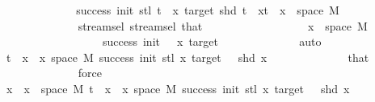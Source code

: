 \begin{isabellebody}
\isanewline
\ \ \ \ \ \ \ \ \ \ \isamarkupfalse%
\ \isamarkupfalse%
\ {\isachardoublequoteopen}success\ {\isacharparenleft}{\kern0pt}init{\isacharminus}{\kern0pt}{}{\isacharparenright}{\kern0pt}\ {\isacharparenleft}{\kern0pt}stl\ {\isacharparenleft}{\kern0pt}t\ {\isacharhash}{\kern0pt}{\isacharhash}{\kern0pt}\ x{\isacharparenright}{\kern0pt}{\isacharparenright}{\kern0pt}\ target{\isachardoublequoteclose}{\isachardoublequoteopen}{\isasymnot}\ shd\ {\isacharparenleft}{\kern0pt}t\ {\isacharhash}{\kern0pt}{\isacharhash}{\kern0pt}\ x{\isacharparenright}{\kern0pt}{\isachardoublequoteclose}{\isachardoublequoteopen}{\isacharparenleft}{\kern0pt}t\ {\isacharhash}{\kern0pt}{\isacharhash}{\kern0pt}\ x{\isacharparenright}{\kern0pt}\ {\isasymin}\ space\ M{\isachardoublequoteclose}\isanewline
\ \ \ \ \ \ \ \ \ \ \ \ \isamarkupfalse%
\ stream{\isachardot}{\kern0pt}sel{\isacharparenleft}{\kern0pt}{}{\isacharparenright}{\kern0pt}\ stream{\isachardot}{\kern0pt}sel{\isacharparenleft}{\kern0pt}{}{\isacharparenright}{\kern0pt}\ that\isanewline
\ \ \ \ \ \ \ \ \ \ \ \ \ \ \ \ \ \ {\isacartoucheopen}x\ {\isasymin}\ space\ M{\isacartoucheclose}\isanewline
\ \ \ \ \ \ \ \ \ \ \ \ \ \ \ \ \ \ {\isacartoucheopen}success\ {\isacharparenleft}{\kern0pt}init\ {\isacharminus}{\kern0pt}\ {}{\isacharparenright}{\kern0pt}\ x\ target{\isacartoucheclose}\isanewline
\ \ \ \ \ \ \ \ \ \ \ \ \isamarkupfalse%
\ auto\isanewline
\ \ \ \ \ \ \ \ \ \ \isamarkupfalse%
\ \isamarkupfalse%
\ {\isachardoublequoteopen}t\ {\isacharhash}{\kern0pt}{\isacharhash}{\kern0pt}\ x\ {\isasymin}\ {\isacharbraceleft}{\kern0pt}x{\isasymin}\ space\ M{\isachardot}{\kern0pt}\ success\ {\isacharparenleft}{\kern0pt}init{\isacharminus}{\kern0pt}{}{\isacharparenright}{\kern0pt}\ {\isacharparenleft}{\kern0pt}stl\ x{\isacharparenright}{\kern0pt}\ target\ {\isasymand}\ {\isasymnot}\ shd\ x{\isacharbraceright}{\kern0pt}{\isachardoublequoteclose}\isanewline
\ \ \ \ \ \ \ \ \ \ \ \ \isamarkupfalse%
\ that\isanewline
\ \ \ \ \ \ \ \ \ \ \ \ \isamarkupfalse%
\ force\isanewline
\ \ \ \ \ \ \ \ \ \ \isamarkupfalse%
\ \isamarkupfalse%
\ {\isachardoublequoteopen}x\ {\isasymin}\ {\isacharbraceleft}{\kern0pt}x\ {\isasymin}\ space\ M{\isachardot}{\kern0pt}\ t\ {\isacharhash}{\kern0pt}{\isacharhash}{\kern0pt}\ x\ {\isasymin}\ {\isacharbraceleft}{\kern0pt}x{\isasymin}\ space\ M{\isachardot}{\kern0pt}\ success\ {\isacharparenleft}{\kern0pt}init{\isacharminus}{\kern0pt}{}{\isacharparenright}{\kern0pt}\ {\isacharparenleft}{\kern0pt}stl\ x{\isacharparenright}{\kern0pt}\ target\ {\isasymand}\ {\isasymnot}\ shd\ x{\isacharbraceright}{\kern0pt}{\isacharbraceright}{\kern0pt}{\isachardoublequoteclose}\isanewline

\end{isabellebody}
